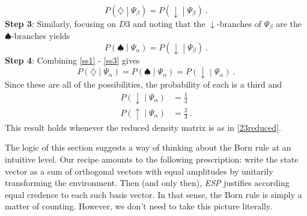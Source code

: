 \documentclass[onecolumn,secnumarabic,amsmath,amssymb,balancelastpage,nofootinbib]{article}
\begin{document}
\begin{equation}
P\left(\diamondsuit\middle|\Psi_\beta\right)=P\left(\downarrow\middle|\Psi_\beta\right)\ .
\label{ss2}
\end{equation}
\textbf{Step 3}:  Similarly, focusing on $D3$ and noting that the $\downarrow$-branches of $\Psi_\beta$ are the $\spadesuit$-branches yields
\begin{equation}
P\left(\spadesuit\middle|\Psi_\alpha\right)=P\left(\downarrow\middle|\Psi_\beta\right)\ .
\label{ss3}
\end{equation}
\textbf{Step 4}:  Combining \eqref{ss1} - \eqref{ss3} gives
\begin{equation}
P\left(\diamondsuit\middle|\Psi_\alpha\right)=P\left(\spadesuit\middle|\Psi_\alpha\right)=P\left(\downarrow\middle|\Psi_\alpha\right)\ .
\end{equation}
Since these are all of the possibilities, the probability of each is a third and 
\begin{align}
P\left(\downarrow\middle|\Psi_\alpha\right)&=\frac{1}{3}
\nonumber
\\
P\left(\uparrow\middle|\Psi_\alpha\right)&=\frac{2}{3}\ .
\end{align}
This result holds whenever the reduced density matrix is as in \eqref{23reduced}.

The logic of this section suggests a way of thinking about the Born rule at an intuitive level. Our recipe amounts to the following prescription: write the state vector as a sum of orthogonal vectors with equal amplitudes by unitarily transforming the environment. Then (and only then), \emph{ESP} justifies according equal credence to each such basis vector.  In that sense, the Born rule is simply a matter of counting.  However, we don't need to take this picture literally.
\end{document}
